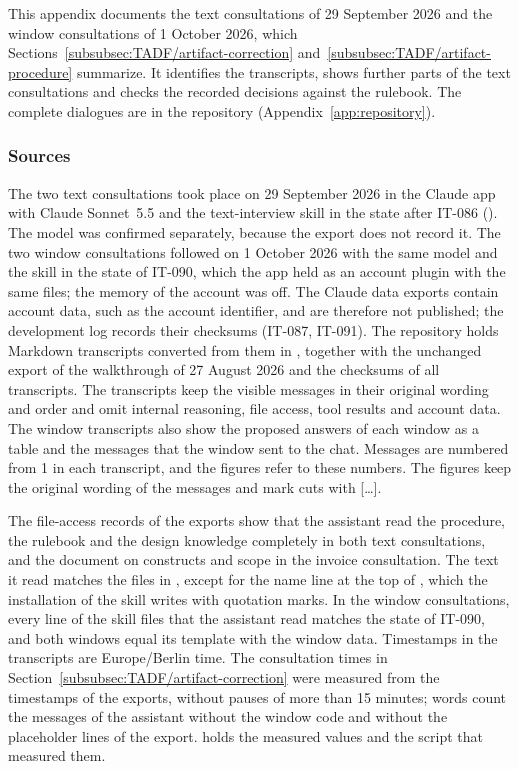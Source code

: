 This appendix documents the text consultations of 29 September 2026 and the window consultations of 1 October 2026, which Sections~\ref{subsubsec:TADF/artifact-correction} and~\ref{subsubsec:TADF/artifact-procedure} summarize. It identifies the transcripts, shows further parts of the text consultations and checks the recorded decisions against the rulebook. The complete dialogues are in the repository (Appendix~\ref{app:repository}).

\subsubsection{Sources}
\label{app:transcripts/source}
\label{app:transcripts/context}

The two text consultations took place on 29 September 2026 in the Claude app with Claude Sonnet~5.5 and the text-interview skill in the state after \mbox{IT-086} (). The model was confirmed separately, because the export does not record it. The two window consultations followed on 1 October 2026 with the same model and the skill  in the state of \mbox{IT-090}, which the app held as an account plugin with the same files; the memory of the account was off. The Claude data exports contain account data, such as the account identifier, and are therefore not published; the development log records their checksums (IT-087, IT-091). The repository holds Markdown transcripts converted from them in , together with the unchanged export of the walkthrough of 27 August 2026 and the checksums of all transcripts. The transcripts keep the visible messages in their original wording and order and omit internal reasoning, file access, tool results and account data. The window transcripts also show the proposed answers of each window as a table and the messages that the window sent to the chat. Messages are numbered from 1 in each transcript, and the figures refer to these numbers. The figures keep the original wording of the messages and mark cuts with [\ldots].

The file-access records of the exports show that the assistant read the procedure, the rulebook and the design knowledge completely in both text consultations, and the document on constructs and scope in the invoice consultation. The text it read matches the files in , except for the name line at the top of , which the installation of the skill writes with quotation marks. In the window consultations, every line of the skill files that the assistant read matches the state of \mbox{IT-090}, and both windows equal its template with the window data. Timestamps in the transcripts are Europe/Berlin time. The consultation times in Section~\ref{subsubsec:TADF/artifact-correction} were measured from the timestamps of the exports, without pauses of more than 15 minutes; words count the messages of the assistant without the window code and without the placeholder lines of the export.  holds the measured values and the script that measured them.


